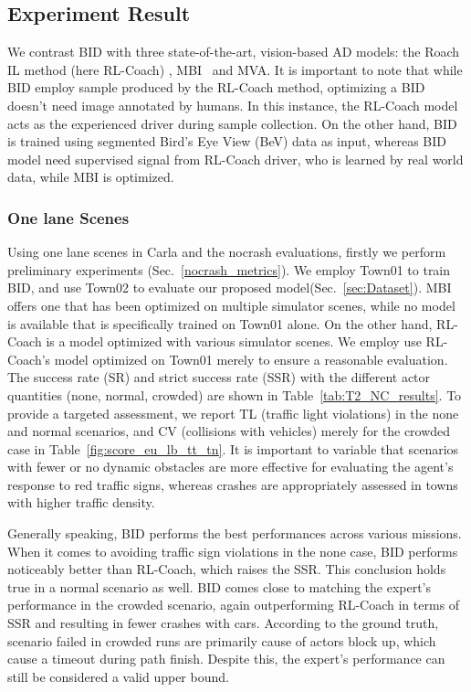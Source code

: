 \subsection{Experiment Result}
\label{sec:Results}
\hspace{1pc}We contrast BID with three state-of-the-art, vision-based AD models: the Roach IL method (here RL-Coach) \cite{Zhang:2021}, MBI~\cite{Hu:2022} and MVA\cite{xiao2023scaling}. 
It is important to note that while BID employ sample produced by the RL-Coach method, optimizing a BID doesn't need image annotated by humans. 
In this instance, the RL-Coach model acts as the experienced driver during sample collection.
On the other hand, BID is trained using segmented Bird's Eye View (BeV) data as input, whereas BID model need supervised signal from RL-Coach driver, who is learned by real world data, while MBI is optimized.


\subsubsection{One lane Scenes} \label{sec:small_town_results}

\hspace{1pc}Using one lane scenes in Carla and  the nocrash evaluations, firstly we perform preliminary experiments (Sec.~\ref{nocrash_metrics}). 
We employ Town01 to train BID, and use Town02 to evaluate our proposed model(Sec.~\ref{sec:Dataset}). 
MBI offers one that has been optimized on multiple simulator scenes, while no model is available that is specifically trained on Town01 alone. 
On the other hand, RL-Coach is a model optimized with various simulator scenes. 
We employ use RL-Coach's model optimized on Town01 merely to ensure a reasonable evaluation. 
The success rate (SR) and strict success rate (SSR) with the different actor quantities (none, normal, crowded) are shown in Table~\ref{tab:T2_NC_results}. 
To provide a targeted assessment, we report TL (traffic light violations) in the none and normal scenarios, and CV (collisions with vehicles) merely for the crowded case in Table~\ref{fig:score_eu_lb_tt_tn}. 
It is important to variable that scenarios with fewer or no dynamic obstacles are more effective for evaluating the agent's response to red traffic signs, whereas crashes are appropriately assessed in towns with higher traffic density.


Generally speaking, BID performs the best performances across various missions. 
When it comes to avoiding traffic sign violations in the none case, BID performs noticeably better than RL-Coach, which raises the SSR.
This conclusion holds true in a normal scenario as well. 
BID comes close to matching the expert's performance in the crowded scenario, again outperforming RL-Coach in terms of SSR and resulting in fewer crashes with cars. 
According to the ground truth, scenario failed in crowded runs are primarily cause of actors block up, which cause a timeout during path finish. 
Despite this, the expert's performance can still be considered a valid upper bound.


